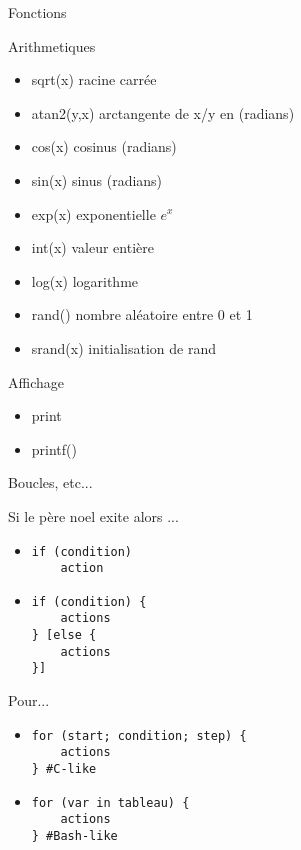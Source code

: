 \def\ftitle{Fonctions}
\begin{frame}[containsverbatim]{\ftitle}
\def\blocktitle{Arithmetiques}
\begin{block}{\blocktitle}
\begin{itemize}
\item sqrt(x) 	racine carrée
\item atan2(y,x)  	 arctangente de x/y en (radians)
\item cos(x) 	cosinus (radians)
\item sin(x) 	sinus (radians)
\item exp(x) 	exponentielle $e^{x}$
\item int(x) 	valeur entière
\item log(x) 	logarithme
\item rand() 	nombre aléatoire entre 0 et 1
\item srand(x) 	initialisation de rand
\end{itemize}
\end{block}

\def\blocktitle{Affichage}
\begin{block}{\blocktitle}
\begin{itemize}
\item print
\item printf()
\end{itemize}
\end{block}
\end{frame}

\def\ftitle{Boucles, etc...}
\begin{frame}[containsverbatim]{\ftitle}
\def\blocktitle{Si le père noel exite alors ...}
\begin{block}{\blocktitle}
\begin{itemize}
\item \begin{verbatim}
if (condition)
	action
\end{verbatim}
\item \begin{verbatim}
if (condition) {
	actions
} [else {
	actions
}]
\end{verbatim}
\end{itemize}
\end{block}
\def\blocktitle{Pour...}
\begin{block}{\blocktitle}
\begin{itemize}
\item \begin{verbatim}
for (start; condition; step) {
	actions
} #C-like
\end{verbatim}
\item \begin{verbatim}
for (var in tableau) {
	actions
} #Bash-like
\end{verbatim}
\end{itemize}
\end{block}
\end{frame}



